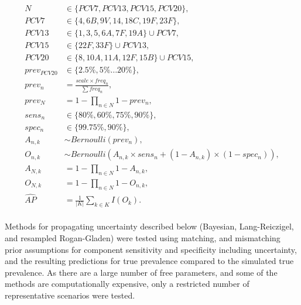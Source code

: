 \documentclass[a4paper, 12pt, twoside]{article}
\begin{document}
\begin{equation*}
\begin{aligned}
N &\in \{PCV7, PCV13, PCV15, PCV20\}, \\
PCV7 &\in \{4, 6B, 9V, 14, 18C, 19F, 23F\}, \\
PCV13 &\in \{1, 3, 5, 6A, 7F, 19A\} \cup PCV7, \\
PCV15 &\in \{22F, 33F\} \cup PCV13,\\
PCV20 &\in \{8, 10A, 11A, 12F, 15B\} \cup PCV15,\\
prev_{PCV20} &\in \{2.5\%, 5\% \dots 20\% \},  \\
prev_n &= \frac{scale \times freq_n}{\sum{freq_n}}, \\
prev_N &= 1-\prod_{n \in N}{1-prev_n}, \\
sens_n &\in \{80\%, 60\%, 75\%, 90\% \},  \\
spec_n &\in \{99.75\%,90\% \}, \\
A_{n,k} &\sim Bernoulli(prev_n), \\
O_{n,k} &\sim Bernoulli(A_{n,k} \times sens_n + (1-A_{n,k}) \times (1-spec_n)), \\
A_{N,k} &= 1-\prod_{n \in N}{1-A_{n,k}}, \\
O_{N,k} &= 1-\prod_{n \in N}{1-O_{n,k}}, \\
\widehat{AP} &= \frac{1}{|K|}\sum_{k \in K}{I(O_{k})}. \\
\end{aligned}
\end{equation*}

Methods for propagating uncertainty described below (Bayesian, Lang-Reiczigel, and resampled Rogan-Gladen) were tested using matching, and mismatching prior assumptions for component sensitivity and specificity including uncertainty, and the resulting predictions for true prevalence compared to the simulated true prevalence. As there are a large number of free parameters, and some of the methods are computationally expensive, only a restricted number of representative scenarios were tested.
\end{document}
